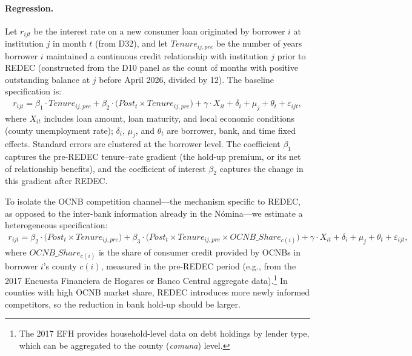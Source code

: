 \documentclass[12pt]{article}
\theoremstyle{plain}
\theoremstyle{plain}
\begin{document}
\paragraph{Regression.} Let $r_{ijt}$ be the interest rate on a new consumer loan originated by borrower $i$ at institution $j$ in month $t$ (from D32), and let $Tenure_{ij,pre}$ be the number of years borrower $i$ maintained a continuous credit relationship with institution $j$ prior to REDEC (constructed from the D10 panel as the count of months with positive outstanding balance at $j$ before April 2026, divided by 12). The baseline specification is:
\begin{align}
    r_{ijt} = \beta_1 \cdot Tenure_{ij,pre} + \beta_2 \cdot \bigl(Post_t \times Tenure_{ij,pre}\bigr) + \gamma \cdot X_{it} + \delta_i + \mu_j + \theta_t + \varepsilon_{ijt},
\label{eq:holdup_baseline}
\end{align}
where $X_{it}$ includes loan amount, loan maturity, and local economic conditions (county unemployment rate); $\delta_i$, $\mu_j$, and $\theta_t$ are borrower, bank, and time fixed effects. Standard errors are clustered at the borrower level. The coefficient $\beta_1$ captures the pre-REDEC tenure--rate gradient (the hold-up premium, or its net of relationship benefits), and the coefficient of interest $\beta_2$ captures the change in this gradient after REDEC.

To isolate the OCNB competition channel---the mechanism specific to REDEC, as opposed to the inter-bank information already in the N\'omina---we estimate a heterogeneous specification:
\begin{align}
    r_{ijt} = \beta_2 \cdot \bigl(Post_t \times Tenure_{ij,pre}\bigr) + \beta_3 \cdot \bigl(Post_t \times Tenure_{ij,pre} \times OCNB\_Share_{c(i)}\bigr) + \gamma \cdot X_{it} + \delta_i + \mu_j + \theta_t + \varepsilon_{ijt},
\label{eq:holdup_ocnb}
\end{align}
where $OCNB\_Share_{c(i)}$ is the share of consumer credit provided by OCNBs in borrower $i$'s county $c(i)$, measured in the pre-REDEC period (e.g., from the 2017 Encuesta Financiera de Hogares or Banco Central aggregate data).\footnote{The 2017 EFH provides household-level data on debt holdings by lender type, which can be aggregated to the county (\textit{comuna}) level.} In counties with high OCNB market share, REDEC introduces more newly informed competitors, so the reduction in bank hold-up should be larger.
\end{document}
